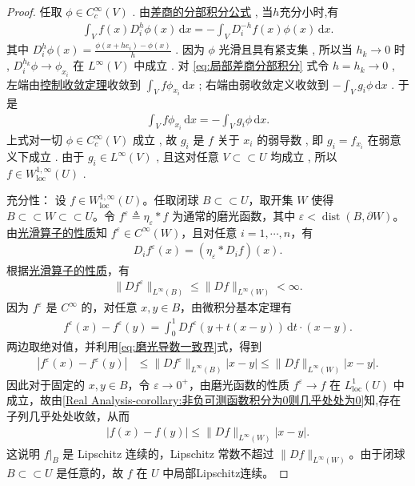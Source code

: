 \documentclass[../../main.tex]{subfiles}
\begin{document}
\begin{proof}
任取 $\phi\in C_c^\infty(V)$ . 由\hyperref[theorem:ch05-差商的分部积分公式]{差商的分部积分公式} , 当$h$充分小时,有
\begin{align}\label{eq:局部差商分部积分}
\int_{V}f(x)D_{i}^{h}\phi(x)\,\mathrm{d}x
=-\int_{V}D_{i}^{-h}f(x)\phi(x)\,\mathrm{d}x.
\end{align}
其中 $D_{i}^{h}\phi(x)=\frac{\phi(x+he_i)-\phi(x)}{h}$ . 因为 $\phi$ 光滑且具有紧支集 , 所以当 $h_k\to 0$ 时 , $D_{i}^{h_k}\phi\to \phi_{x_i}$ 在 $L^\infty(V)$ 中成立 . 对 \eqref{eq:局部差商分部积分} 式令 $h=h_k\to 0$ , 左端由\hyperref[Real Analysis-theorem:控制收敛定理]{控制收敛定理}收敛到 $\int_V f\phi_{x_i}\,\mathrm{d}x$ ; 右端由弱收敛定义收敛到 $-\int_V g_i\phi\,\mathrm{d}x$ . 于是
\begin{align*}
\int_{V}f\phi_{x_i}\,\mathrm{d}x=-\int_{V}g_i\phi\,\mathrm{d}x.
\end{align*}
上式对一切 $\phi\in C_c^\infty(V)$ 成立 , 故 $g_i$ 是 $f$ 关于 $x_i$ 的弱导数 , 即 $g_i=f_{x_i}$ 在弱意义下成立 . 由于 $g_i\in L^\infty(V)$ , 且这对任意 $V\subset\subset U$ 均成立 , 所以 $f\in W^{1,\infty}_{\mathrm{loc}}(U)$ .

{\heiti 充分性：}
设 \(f\in W^{1,\infty}_{\mathrm{loc}}(U)\)。任取闭球 \(B\subset\subset U\)，取开集 \(W\) 使得 \(B\subset\subset W\subset\subset U\)。令 \(f^\varepsilon\triangleq\eta_\varepsilon*f\) 为通常的磨光函数，其中 \(\varepsilon<\operatorname{dist}(B,\partial W)\)。
由\hyperref[theorem:appC-光滑算子的性质]{光滑算子的性质}知 \(f^\varepsilon\in C^\infty(W)\)，且对任意 \(i=1,\cdots,n\)，有
\begin{align*}
D_if^\varepsilon(x)=(\eta_\varepsilon*D_if)(x).
\end{align*}
根据\hyperref[theorem:appC-光滑算子的性质]{光滑算子的性质}，有
\begin{align}\label{eq:磨光导数一致界}
\|Df^\varepsilon\|_{L^\infty(B)}\leqslant \|Df\|_{L^\infty(W)}<\infty.
\end{align}
因为 \(f^\varepsilon\) 是 \(C^\infty\) 的，对任意 \(x,y\in B\)，由微积分基本定理有
\begin{align*}
f^\varepsilon(x)-f^\varepsilon(y)=\int_0^1 Df^\varepsilon(y+t(x-y))\,\mathrm{d}t\cdot(x-y).
\end{align*}
两边取绝对值，并利用\eqref{eq:磨光导数一致界}式，得到
\begin{align*}
|f^\varepsilon(x)-f^\varepsilon(y)|
&\leqslant \|Df^\varepsilon\|_{L^\infty(B)}|x-y|
\leqslant \|Df\|_{L^\infty(W)}|x-y|.
\end{align*}
因此对于固定的 \(x,y\in B\)，令 \(\varepsilon\to 0^+\)，由磨光函数的性质 \(f^\varepsilon\to f\) 在 \(L^1_{\mathrm{loc}}(U)\) 中成立，故由\cref{Real Analysis-corollary:非负可测函数积分为0则几乎处处为0}知,存在子列几乎处处收敛，从而
\begin{align*}
|f(x)-f(y)|\leqslant \|Df\|_{L^\infty(W)}|x-y|.
\end{align*}
这说明 \(f|_B\) 是 Lipschitz 连续的，Lipschitz 常数不超过 \(\|Df\|_{L^\infty(W)}\)。由于闭球 \(B\subset\subset U\) 是任意的，故 \(f\) 在 \(U\) 中局部Lipschitz连续。
\end{proof}
\end{document}
